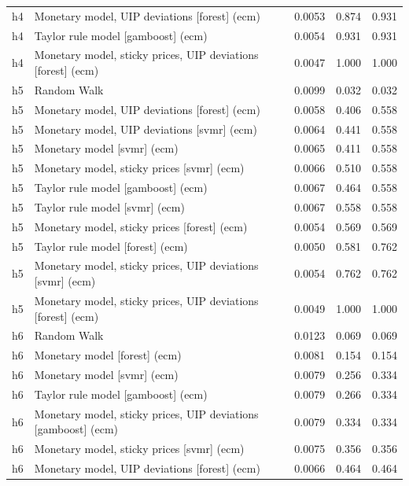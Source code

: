 \begin{ThreePartTable}
\begin{longtable}[t]{cp{5.5cm}ccc}
h4 & \raggedright Monetary model, UIP deviations [forest] (ecm) & 0.0053 & 0.874 & 0.931\\
h4 & \raggedright Taylor rule model [gamboost] (ecm) & 0.0054 & 0.931 & 0.931\\
h4 & \raggedright Monetary model, sticky prices, UIP deviations [forest] (ecm) & 0.0047 & 1.000 & 1.000\\
\addlinespace
h5 & \raggedright Random Walk & 0.0099 & 0.032 & 0.032\\
h5 & \raggedright Monetary model, UIP deviations [forest] (ecm) & 0.0058 & 0.406 & 0.558\\
h5 & \raggedright Monetary model, UIP deviations [svmr] (ecm) & 0.0064 & 0.441 & 0.558\\
h5 & \raggedright Monetary model [svmr] (ecm) & 0.0065 & 0.411 & 0.558\\
h5 & \raggedright Monetary model, sticky prices [svmr] (ecm) & 0.0066 & 0.510 & 0.558\\
h5 & \raggedright Taylor rule model [gamboost] (ecm) & 0.0067 & 0.464 & 0.558\\
h5 & \raggedright Taylor rule model [svmr] (ecm) & 0.0067 & 0.558 & 0.558\\
h5 & \raggedright Monetary model, sticky prices [forest] (ecm) & 0.0054 & 0.569 & 0.569\\
h5 & \raggedright Taylor rule model [forest] (ecm) & 0.0050 & 0.581 & 0.762\\
h5 & \raggedright Monetary model, sticky prices, UIP deviations [svmr] (ecm) & 0.0054 & 0.762 & 0.762\\
h5 & \raggedright Monetary model, sticky prices, UIP deviations [forest] (ecm) & 0.0049 & 1.000 & 1.000\\
\addlinespace
h6 & \raggedright Random Walk & 0.0123 & 0.069 & 0.069\\
h6 & \raggedright Monetary model [forest] (ecm) & 0.0081 & 0.154 & 0.154\\
h6 & \raggedright Monetary model [svmr] (ecm) & 0.0079 & 0.256 & 0.334\\
h6 & \raggedright Taylor rule model [gamboost] (ecm) & 0.0079 & 0.266 & 0.334\\
h6 & \raggedright Monetary model, sticky prices, UIP deviations [gamboost] (ecm) & 0.0079 & 0.334 & 0.334\\
h6 & \raggedright Monetary model, sticky prices [svmr] (ecm) & 0.0075 & 0.356 & 0.356\\
h6 & \raggedright Monetary model, UIP deviations [forest] (ecm) & 0.0066 & 0.464 & 0.464\\

\end{longtable}
\end{ThreePartTable}
